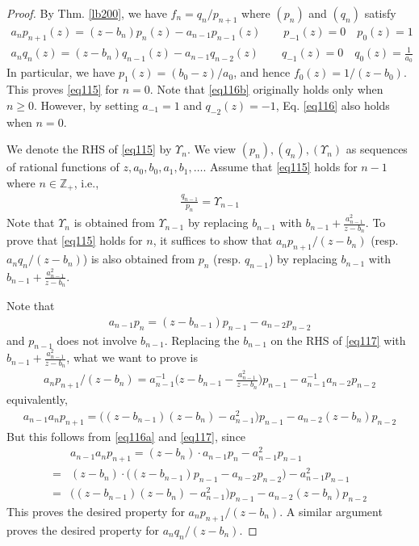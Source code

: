 \documentclass[12pt,b5paper,notitlepage]{article}
\theoremstyle{definition}
\theoremstyle{plain}
\newcommand{\Zbb}{\mathbb Z}
\numberwithin{equation}{section}
\begin{document}
\begin{proof}
By Thm. \ref{lb200}, we have $f_n=q_n/p_{n+1}$ where $(p_n)$ and $(q_n)$ satisfy
\begin{subequations}\label{eq116}
\begin{gather}
a_np_{n+1}(z)=(z-b_n)p_n(z)-a_{n-1}p_{n-1}(z)\qquad p_{-1}(z)=0\quad p_0(z)=1\label{eq116a}\\
a_nq_n(z)=(z-b_n)q_{n-1}(z)-a_{n-1}q_{n-2}(z)\qquad q_{-1}(z)=0\quad q_0(z)=\frac{1}{a_0}\label{eq116b}
\end{gather}
\end{subequations}
In particular, we have $p_1(z)=(b_0-z)/a_0$, and hence $f_0(z)=1/(z-b_0)$. This proves \eqref{eq115} for $n=0$. Note that \eqref{eq116b} originally holds only when $n\geq0$. However, by setting $a_{-1}=1$ and $q_{-2}(z)=-1$, Eq. \eqref{eq116} also holds when $n=0$. 

We denote the RHS of \eqref{eq115} by $\Upsilon_n$. We view $(p_n),(q_n),(\Upsilon_n)$ as sequences of rational functions of $z,a_0,b_0,a_1,b_1,\dots$. Assume that \eqref{eq115} holds for $n-1$ where $n\in\Zbb_+$, i.e.,
\begin{align*}
\frac{q_{n-1}}{p_n}=\Upsilon_{n-1}
\end{align*}
Note that $\Upsilon_n$ is obtained from $\Upsilon_{n-1}$ by replacing $b_{n-1}$ with $b_{n-1}+\frac{a_{n-1}^2}{z-b_n}$. To prove that \eqref{eq115} holds for $n$, it suffices to show that $a_np_{n+1}/(z-b_n)$ (resp. $a_nq_n/(z-b_n)$) is also obtained from $p_n$ (resp. $q_{n-1}$) by replacing $b_{n-1}$ with $b_{n-1}+\frac{a_{n-1}^2}{z-b_n}$. 

Note that
\begin{align}\label{eq117}
a_{n-1}p_n=(z-b_{n-1})p_{n-1}-a_{n-2}p_{n-2}
\end{align}
and $p_{n-1}$ does not involve $b_{n-1}$. Replacing the $b_{n-1}$ on the RHS of \eqref{eq117} with $b_{n-1}+\frac{a_{n-1}^2}{z-b_n}$, what we want to prove is
\begin{align*}
a_np_{n+1}/(z-b_n)=a_{n-1}^{-1}\Big(z-b_{n-1}-\frac{a_{n-1}^2}{z-b_n}\Big)p_{n-1}-a_{n-1}^{-1}a_{n-2}p_{n-2}
\end{align*}
equivalently,
\begin{align*}
a_{n-1}a_np_{n+1}=\Big((z-b_{n-1})(z-b_n)-a_{n-1}^2\Big)p_{n-1}-a_{n-2}(z-b_n)p_{n-2}
\end{align*}
But this follows from \eqref{eq116a} and \eqref{eq117}, since
\begin{align*}
&a_{n-1}a_np_{n+1}=(z-b_n)\cdot a_{n-1}p_n-a_{n-1}^2p_{n-1}\\
=&(z-b_n)\cdot \big((z-b_{n-1})p_{n-1}-a_{n-2}p_{n-2}\big)-a_{n-1}^2p_{n-1}\\
=&\Big((z-b_{n-1})(z-b_n)-a_{n-1}^2\Big)p_{n-1}-a_{n-2}(z-b_n)p_{n-2}
\end{align*}
This proves the desired property for $a_np_{n+1}/(z-b_n)$. A similar argument proves the desired property for $a_nq_n/(z-b_n)$. 
\end{proof}
\end{document}
